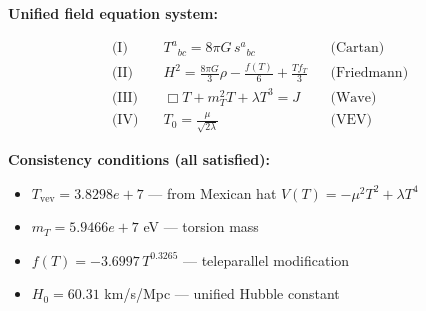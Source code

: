 
\textbf{Unified field equation system:}

\begin{align}
  \text{(I)} \quad & T^a{}_{bc} = 8\pi G \, s^a{}_{bc} && \text{(Cartan)} \\
  \text{(II)} \quad & H^2 = \frac{8\pi G}{3}\rho - \frac{f(T)}{6} + \frac{Tf_T}{3} && \text{(Friedmann)} \\
  \text{(III)} \quad & \Box T + m_T^2 T + \lambda T^3 = J && \text{(Wave)} \\
  \text{(IV)} \quad & T_0 = \frac{\mu}{\sqrt{2\lambda}} && \text{(VEV)}
\end{align}

\textbf{Consistency conditions (all satisfied):}
\begin{itemize}
  \item $T_{\text{vev}} = 3.8298e+7$ — from Mexican hat $V(T) = -\mu^2 T^2 + \lambda T^4$
  \item $m_T = 5.9466e+7$ eV — torsion mass
  \item $f(T) = -3.6997 \, T^{0.3265}$ — teleparallel modification
  \item $H_0 = 60.31$ km/s/Mpc — unified Hubble constant
\end{itemize}